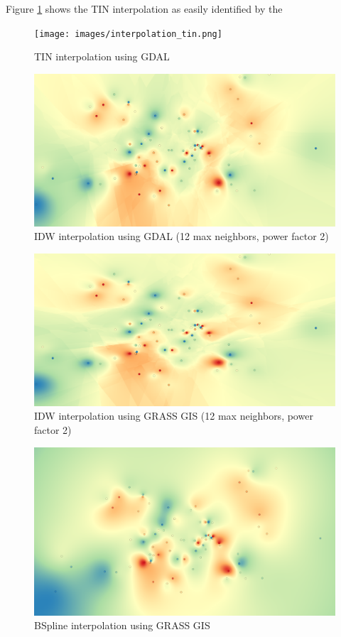 Figure \ref{fig:result_linear} shows the TIN interpolation as easily identified by the 

\begin{figure}
	\texttt{[image: images/interpolation\_tin.png]}
	\caption{TIN interpolation using GDAL}
	\label{fig:result_linear}
\end{figure}


\begin{figure}
	\includegraphics[width=\linewidth]{comparison/compare_idw_gdal.png}
	\caption{IDW interpolation using GDAL (12 max neighbors, power factor 2)}
	\label{fig:result_idw_gdal}
\end{figure}

\begin{figure}
	\includegraphics[width=\linewidth]{comparison/compare_idw_grass.png}
	\caption{IDW interpolation using GRASS GIS (12 max neighbors, power factor 2)}
	\label{fig:result_idw_grass}
\end{figure}

\begin{figure}
	\includegraphics[width=\linewidth]{comparison/compare_bspline_saga.png}
	\caption{BSpline interpolation using GRASS GIS}
	\label{fig:result_bspline}
\end{figure}
